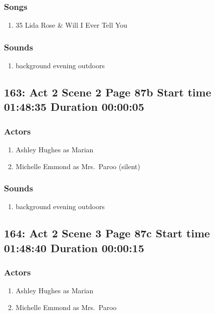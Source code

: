 \subsubsection{Songs}
\begin{enumerate}
\item 35 Lida Rose \& Will I Ever Tell You
\end{enumerate}\subsubsection{Sounds}
\begin{enumerate}
\item background evening outdoors
\end{enumerate}
\subsection{163: Act 2 Scene 2 Page 87b Start time 01:48:35 Duration 00:00:05}

\subsubsection{Actors}
\begin{enumerate}
\item Ashley Hughes as Marian
\item Michelle Emmond as Mrs.~Paroo (silent)
\end{enumerate}

\subsubsection{Sounds}
\begin{enumerate}
\item background evening outdoors
\end{enumerate}
\subsection{164: Act 2 Scene 3 Page 87c Start time 01:48:40 Duration 00:00:15}

\subsubsection{Actors}
\begin{enumerate}
\item Ashley Hughes as Marian
\item Michelle Emmond as Mrs.~Paroo
\end{enumerate}

